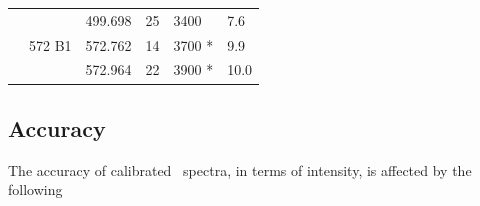 \begin{table}
\begin{tabular}{|l|l|l|l|l|l|}
  \cline{3-3}
  \cline{4-4}
  \cline{5-5}
  \cline{6-6}
                &                      & 499.698                   & 25           & 3400                 & 7.6 \\
  \cline{2-2}
  \cline{3-3}
  \cline{4-4}
  \cline{5-5}
  \cline{6-6}
                & 572 B1              & 572.762                    & 14           & 3700 *              & 9.9 \\
  \cline{3-3}
  \cline{4-4}
  \cline{5-5}
  \cline{6-6}
                &                     & 572.964                    & 22           & 3900 *              & 10.0 \\
  \hline
\end{tabular}
\end{table}

\subsection*{Accuracy}

The accuracy of calibrated \smr\ spectra, in terms of intensity, is affected by the following

